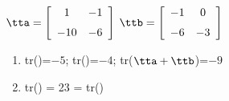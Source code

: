 {$\tta = \left[ \begin {array}{cc} 1&-1\\\noalign{\medskip}-10&-6\end {array}
 \right]$
 \quad
$\ttb = \left[ \begin {array}{cc} -1&0\\\noalign{\medskip}-6&-3\end {array}
 \right]$
} 
{
\begin{enumerate}
\item		tr(\tta)=$-5$; tr(\ttb)=$-4$; tr($\tta+\ttb$)=$-9$
\item		tr(\tta\ttb) = 23 = tr(\ttb\tta)
\end{enumerate}
}



  

